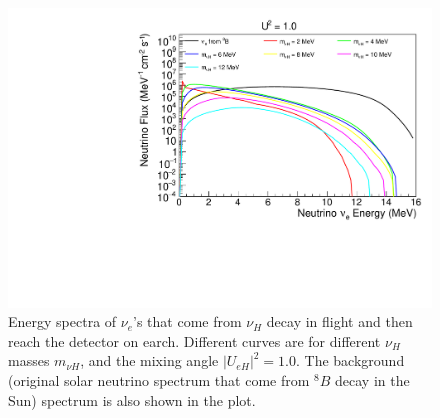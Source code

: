 \documentclass[%
 reprint,
 amsmath,amssymb,
 aps,
 prd,
twocolumn,
]{revtex4-1}
\begin{document}
\begin{figure}[!ht]
\includegraphics[width=0.99\columnwidth]{../plots/DecayInFlightNuLEnergy_U1.0_AllMass_linXlogY.pdf}
\caption{Energy spectra of $\nu_e$'s that come from $\nu_H$ decay in flight and then reach the detector on earch. Different curves are for different $\nu_H$ masses $m_{\nu H}$, and the mixing angle $|U_{eH}|^2 = 1.0$. 
The background (original solar neutrino spectrum that come from $^8 B$ decay in the Sun) spectrum is also shown in the plot.}
\label{fig:DecayInFlightSpectrum_U1em0_AllMass}
\end{figure}




\clearpage


\end{document}
